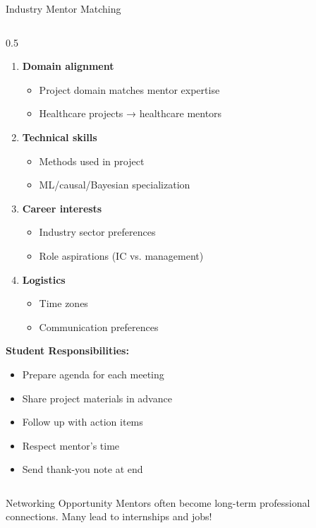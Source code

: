 \begin{frame}{Industry Mentor Matching}
\begin{columns}
\begin{column}{0.5\textwidth}
\begin{enumerate}
\item \textbf{Domain alignment}
   \begin{itemize}
   \item Project domain matches mentor expertise
   \item Healthcare projects → healthcare mentors
   \end{itemize}

\item \textbf{Technical skills}
   \begin{itemize}
   \item Methods used in project
   \item ML/causal/Bayesian specialization
   \end{itemize}

\item \textbf{Career interests}
   \begin{itemize}
   \item Industry sector preferences
   \item Role aspirations (IC vs. management)
   \end{itemize}

\item \textbf{Logistics}
   \begin{itemize}
   \item Time zones
   \item Communication preferences
   \end{itemize}
\end{enumerate}

\vspace{0.3cm}

\textbf{Student Responsibilities:}
\begin{itemize}
\item Prepare agenda for each meeting
\item Share project materials in advance
\item Follow up with action items
\item Respect mentor's time
\item Send thank-you note at end
\end{itemize}
\end{column}
\end{columns}

\vspace{0.2cm}
\begin{alertblock}{Networking Opportunity}
Mentors often become long-term professional connections. Many lead to internships and jobs!
\end{alertblock}
\end{frame}

